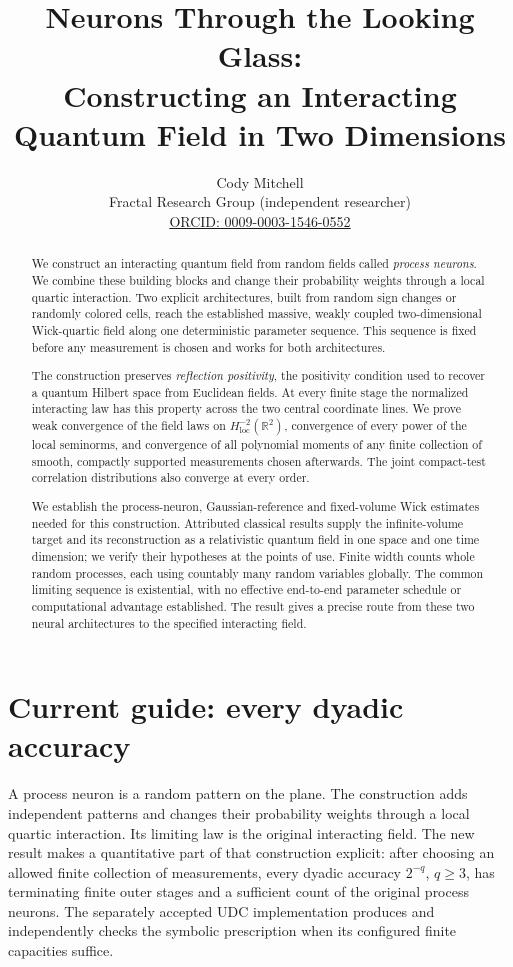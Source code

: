 \documentclass[11pt]{article}
\title{Neurons Through the Looking Glass:\\[0.3em]
Constructing an Interacting Quantum Field in Two Dimensions}
\author{Cody Mitchell\\[0.2em]
\small Fractal Research Group (independent researcher)\\
\small \href{https://orcid.org/0009-0003-1546-0552}{ORCID: 0009-0003-1546-0552}}
\date{\fbox{\parbox{0.92\textwidth}{\centering
\textbf{6 November 2026. Version 3.}\\[0.2em]
Preprint. Construction, conditional quantitative bounds and renormalized local squares.\\[0.2em]
Editorial revision of version 2; mathematical results unchanged.\\[0.2em]
Dated revision guides retain their historical status.}}}
\theoremstyle{plain}
\theoremstyle{definition}
\theoremstyle{remark}
\newcommand{\R}{\mathbb{R}}
\begin{document}
\maketitle

\begin{abstract}
We construct an interacting quantum field from random fields called
\emph{process neurons}. We combine these building blocks and change their
probability weights through a local quartic interaction. Two explicit
architectures, built from random sign changes or randomly colored cells, reach
the established massive, weakly coupled two-dimensional Wick-quartic field along
one deterministic parameter sequence. This sequence is fixed before any
measurement is chosen and works for both architectures.

The construction preserves \emph{reflection positivity}, the positivity
condition used to recover a quantum Hilbert space from Euclidean fields.
At every finite stage the normalized interacting law has this property across
the two central coordinate lines. We prove weak convergence of the field laws on
$H^{-2}_{\mathrm{loc}}(\R^2)$, convergence of every power of the local seminorms,
and convergence of all polynomial moments of any finite collection of smooth,
compactly supported measurements chosen afterwards. The joint compact-test
correlation distributions also converge at every order.

We establish the process-neuron, Gaussian-reference and fixed-volume Wick
estimates needed for this construction. Attributed classical results supply
the infinite-volume target and its reconstruction as a relativistic quantum
field in one space and one time dimension; we verify their hypotheses at the
points of use. Finite width counts whole random processes, each using
countably many random variables globally. The common limiting sequence is
existential, with no effective end-to-end parameter schedule or computational
advantage established. The result gives a precise route from these two neural
architectures to the specified interacting field.
\end{abstract}

\clearpage
\section*{Current guide: every dyadic accuracy}
\label{uda:guide}
A process neuron is a random pattern on the plane. The construction adds
independent patterns and changes their probability weights through a local
quartic interaction. Its limiting law is the original interacting field.
The new result makes a quantitative part of that construction explicit:
after choosing an allowed finite collection of measurements, every dyadic
accuracy $2^{-q}$, $q\ge3$, has terminating finite outer stages and a
sufficient count of the original process neurons. The separately accepted
UDC implementation produces and independently checks the symbolic prescription
when its configured finite capacities suffice.
\end{document}
